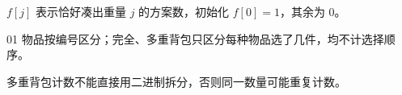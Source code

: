 $f[j]$ 表示恰好凑出重量 $j$ 的方案数，初始化 $f[0]=1$，其余为 $0$。

01 物品按编号区分；完全、多重背包只区分每种物品选了几件，均不计选择顺序。

多重背包计数不能直接用二进制拆分，否则同一数量可能重复计数。
